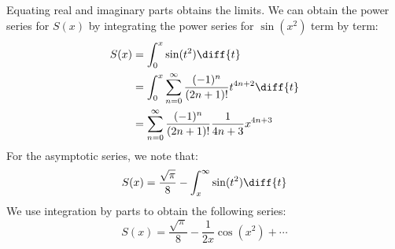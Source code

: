 \documentclass[crop=false,class=book,oneside]{standalone}
\begin{document}
            Equating real and imaginary parts obtains the limits.
            We can obtain the power series for $S(x)$ by integrating
            the power series for $\sin(x^{2})$ term by term:
            \begin{align}
                S(x)&=\int_{0}^{x}\sin(t^{2})\diff{t}\\
                &=\int_{0}^{x}\sum_{n=0}^{\infty}
                \frac{(-1)^{n}}{(2n+1)!}t^{4n+2}\diff{t}\\
                &=\sum_{n=0}^{\infty}
                \frac{(-1)^{n}}{(2n+1)!}\frac{1}{4n+3}x^{4n+3}
            \end{align}
            For the asymptotic series, we note that:
            \begin{equation}
                S(x)=\frac{\sqrt{\pi}}{8}-
                \int_{x}^{\infty}\sin(t^{2})\diff{t}
            \end{equation}
            We use integration by parts to obtain the following
            series:
            \begin{equation}
                S(x)=
                \frac{\sqrt{\pi}}{8}-\frac{1}{2x}\cos(x^{2})+\cdots
            \end{equation}
\end{document}
